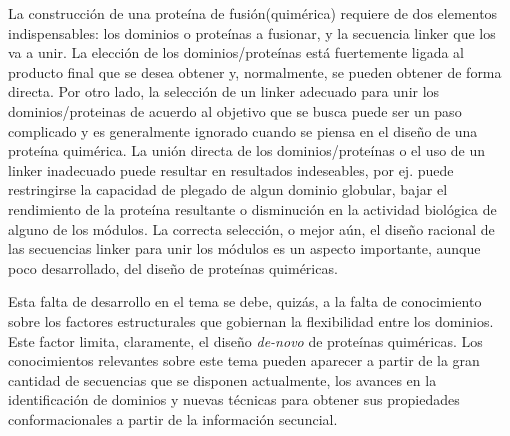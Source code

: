 La construcción de una proteína de fusión(quimérica) requiere de dos elementos indispensables: 
los dominios o proteínas a fusionar, y la secuencia linker que los va a unir.
La elección de los dominios/proteínas está fuertemente ligada al producto final que se desea obtener y, normalmente, se pueden obtener de forma directa.
Por otro lado, la selección de un linker adecuado para unir los dominios/proteinas de acuerdo al objetivo que se busca puede ser un paso complicado y es generalmente ignorado cuando se piensa en el diseño de una proteína quimérica.
La unión directa de los dominios/proteínas o el uso de un linker inadecuado puede resultar en resultados indeseables, por ej. puede restringirse la capacidad de plegado de algun dominio globular, bajar el rendimiento de la proteína resultante o
disminución en la actividad biológica de alguno de los módulos.
La correcta selección, o mejor aún, el diseño racional de las secuencias linker para unir los módulos es un aspecto importante, aunque poco desarrollado, del diseño de proteínas quiméricas. 

Esta falta de desarrollo en el tema se debe, quizás, a la falta de conocimiento sobre los factores estructurales que gobiernan la flexibilidad entre los dominios.
Este factor limita, claramente, el diseño \textit{de-novo} de proteínas quiméricas. Los conocimientos relevantes sobre este tema pueden aparecer a partir de la gran cantidad de secuencias que se disponen actualmente, los avances en 
la identificación de dominios y nuevas técnicas para obtener sus propiedades conformacionales a partir de la información secuncial.


